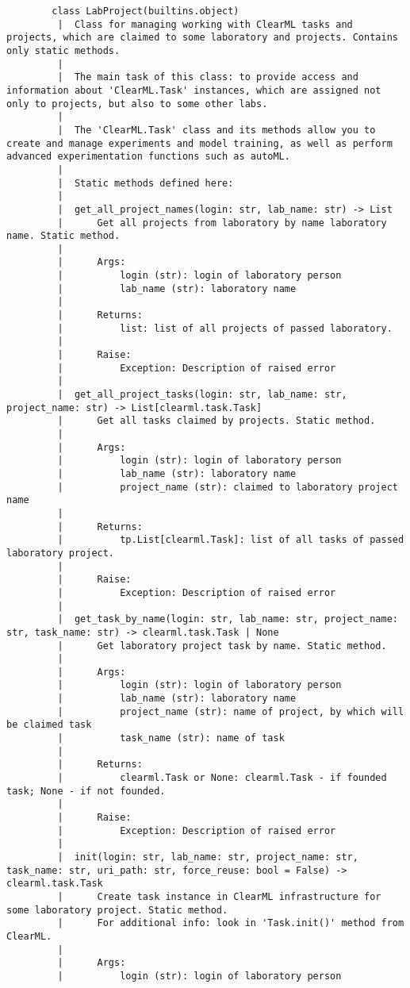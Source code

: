 \begin{lstlisting}
		class LabProject(builtins.object)
		 |  Class for managing working with ClearML tasks and projects, which are claimed to some laboratory and projects. Contains only static methods.
		 |  
		 |  The main task of this class: to provide access and information about 'ClearML.Task' instances, which are assigned not only to projects, but also to some other labs.
		 |  
		 |  The 'ClearML.Task' class and its methods allow you to create and manage experiments and model training, as well as perform advanced experimentation functions such as autoML.
		 |  
		 |  Static methods defined here:
		 |  
		 |  get_all_project_names(login: str, lab_name: str) -> List
		 |      Get all projects from laboratory by name laboratory name. Static method.
		 |      
		 |      Args:
		 |          login (str): login of laboratory person
		 |          lab_name (str): laboratory name
		 |      
		 |      Returns:
		 |          list: list of all projects of passed laboratory.
		 |      
		 |      Raise:
		 |          Exception: Description of raised error
		 |  
		 |  get_all_project_tasks(login: str, lab_name: str, project_name: str) -> List[clearml.task.Task]
		 |      Get all tasks claimed by projects. Static method.
		 |      
		 |      Args:
		 |          login (str): login of laboratory person
		 |          lab_name (str): laboratory name
		 |          project_name (str): claimed to laboratory project name
		 |      
		 |      Returns:
		 |          tp.List[clearml.Task]: list of all tasks of passed laboratory project.
		 |      
		 |      Raise:
		 |          Exception: Description of raised error
		 |  
		 |  get_task_by_name(login: str, lab_name: str, project_name: str, task_name: str) -> clearml.task.Task | None
		 |      Get laboratory project task by name. Static method.
		 |      
		 |      Args:
		 |          login (str): login of laboratory person
		 |          lab_name (str): laboratory name
		 |          project_name (str): name of project, by which will be claimed task
		 |          task_name (str): name of task
		 |      
		 |      Returns:
		 |          clearml.Task or None: clearml.Task - if founded task; None - if not founded.
		 |      
		 |      Raise:
		 |          Exception: Description of raised error
		 |  
		 |  init(login: str, lab_name: str, project_name: str, task_name: str, uri_path: str, force_reuse: bool = False) -> clearml.task.Task
		 |      Create task instance in ClearML infrastructure for some laboratory project. Static method.
		 |      For additional info: look in 'Task.init()' method from ClearML.
		 |      
		 |      Args:
		 |          login (str): login of laboratory person

\end{lstlisting}
